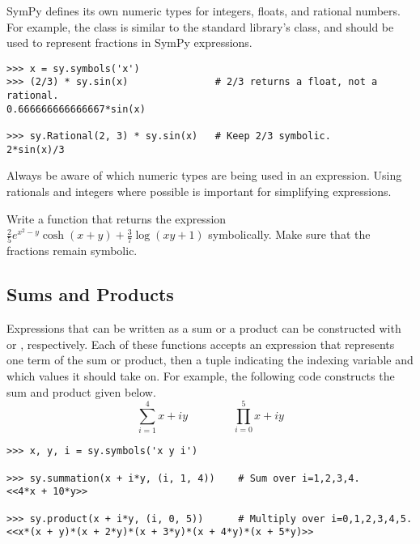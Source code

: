 \begin{info}
SymPy defines its own numeric types for integers, floats, and rational numbers.
For example, the  class is similar to the standard library's  class, and should be used to represent fractions in SymPy expressions.

\begin{lstlisting}
>>> x = sy.symbols('x')
>>> (2/3) * sy.sin(x)               # 2/3 returns a float, not a rational.
0.666666666666667*sin(x)

>>> sy.Rational(2, 3) * sy.sin(x)   # Keep 2/3 symbolic.
2*sin(x)/3
\end{lstlisting}
Always be aware of which numeric types are being used in an expression.
Using rationals and integers where possible is important for simplifying expressions.
\end{info}

\begin{problem} %
Write a function that returns the expression $\frac{2}{5} e^{x^2-y}\cosh(x+y) + \frac{3}{7}\log(xy+1)$ symbolically.
Make sure that the fractions remain symbolic.
\end{problem}

\subsection*{Sums and Products} %

Expressions that can be written as a sum or a product can be constructed with  or , respectively.
Each of these functions accepts an expression that represents one term of the sum or product, then a tuple indicating the indexing variable and which values it should take on.
For example, the following code constructs the sum and product given below.
\[
\sum_{i=1}^{4} x + iy
\qquad\qquad
\prod_{i=0}^{5} x + iy
\]

\begin{lstlisting}
>>> x, y, i = sy.symbols('x y i')

>>> sy.summation(x + i*y, (i, 1, 4))    # Sum over i=1,2,3,4.
<<4*x + 10*y>>

>>> sy.product(x + i*y, (i, 0, 5))      # Multiply over i=0,1,2,3,4,5.
<<x*(x + y)*(x + 2*y)*(x + 3*y)*(x + 4*y)*(x + 5*y)>>
\end{lstlisting}

